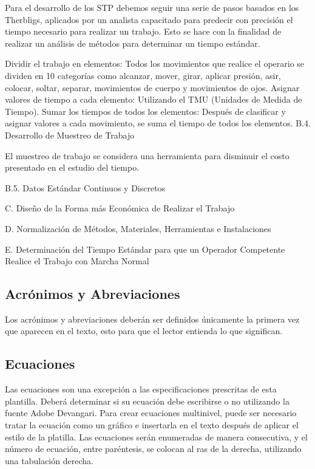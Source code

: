     Para el desarrollo de los STP debemos seguir una serie de pasos basados en los Therbligs, aplicados por un analista capacitado para predecir con precisión el tiempo necesario para realizar un trabajo. Esto se hace con la finalidad de realizar un análisis de métodos para determinar un tiempo estándar.
    
    Dividir el trabajo en elementos: Todos los movimientos que realice el operario se dividen en 10 categorías como alcanzar, mover, girar, aplicar presión, asir, colocar, soltar, separar, movimientos de cuerpo y movimientos de ojos.
    Asignar valores de tiempo a cada elemento: Utilizando el TMU (Unidades de Medida de Tiempo).
    Sumar los tiempos de todos los elementos: Después de clasificar y asignar valores a cada movimiento, se suma el tiempo de todos los elementos.
    B.4. Desarrollo de Muestreo de Trabajo
    
    El muestreo de trabajo se considera una herramienta para disminuir el costo presentado en el estudio del tiempo.
    
    B.5. Datos Estándar Continuos y Discretos
    
    C. Diseño de la Forma más Económica de Realizar el Trabajo
    
    D. Normalización de Métodos, Materiales, Herramientas e Instalaciones
    
    E. Determinación del Tiempo Estándar para que un Operador Competente Realice el Trabajo con Marcha Normal
    \subsection{Acrónimos y Abreviaciones}
    
    Los acrónimos y abreviaciones deberán ser definidos únicamente la primera vez que aparecen en el texto, esto para que el lector entienda lo que significan.
    
    \subsection{Ecuaciones}
    
    Las ecuaciones son una excepción a las especificaciones prescritas de esta plantilla. 
    Deberá determinar si su ecuación debe escribirse o no utilizando la fuente Adobe Devangari. 
    Para crear ecuaciones multinivel, puede ser necesario tratar la ecuación como un gráfico e insertarla en el texto después de aplicar el estilo de la platilla.
    Las ecuaciones serán enumeradas de manera consecutiva, y el número de ecuación, entre paréntesis, se colocan al ras de la derecha, utilizando una tabulación derecha. 
    
